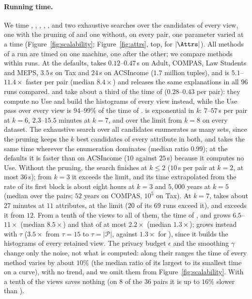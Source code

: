 \paragraph{Running time.}
We time \sys{}, \sysopt{}, \Bone{}, \Btwo{}, \BF{}, \SingleStage{} and two exhaustive searches over the candidates of every view, one with the pruning of \Btwo{} and one without, on every pair, one parameter varied at a time (Figure~\ref{fig:scalability}; Figure~\ref{fig:attrs}, top, for $|\Attrs|$).
All methods of a run are timed on one machine, one after the other; we compare methods within runs.
At the defaults, \sys{} takes $0.12$--$0.47$\,s on Adult, COMPAS, Law Students and MEPS, $3.5$\,s on Tax and $24$\,s on ACSIncome ($1.7$ million tuples), and \sysopt{} is $5.1$--$11.4\times$ faster per pair (median $8.4\times$) and releases the same explanations in all $96$ runs compared.
\BF{} and \SingleStage{} take about a third of the time of \sys{} ($0.28$--$0.43$ per pair): they compute no Use and build the histograms of every view instead, while the Use pass over every view is $94$--$99\%$ of the time of \sys{}.
\Btwo{} is exponential in $k$: $7$--$57$\,s per pair at $k=6$, $2.3$--$15.5$ minutes at $k=7$, and over the limit from $k=8$ on every dataset.
The exhaustive search over all candidates enumerates as many sets, since the pruning keeps the $k$ best candidates of every attribute in both, and takes the same time wherever the enumeration dominates (median ratio $0.99$); at the defaults it is faster than \Btwo{} on ACSIncome ($10$ against $25$\,s) because it computes no Use.
Without the pruning, the search finishes at $k \le 2$ ($10$\,s per pair at $k=2$, at most $36$\,s); from $k=3$ it exceeds the limit, and its time extrapolated from the rate of its first block is about eight hours at $k=3$ and $5{,}000$ years at $k=5$ (median over the pairs; $52$ years on COMPAS, $10^5$ on Tax).
At $k=7$, \Btwo{} takes about $27$ minutes at $11$ attributes, at the limit ($20$ of its $69$ runs exceed it), and exceeds it from $12$.
From a tenth of the views to all of them, the time of \sys{}, \BF{} and \SingleStage{} grows $6.5$--$11\times$ (median $8.5\times$) and that of \sysopt{} at most $2.2\times$ (median $1.3\times$); \sysopt{} grows instead with $\tau$ ($3.5\times$ from $\tau=15$ to $\tau=|\mathcal{P}|$, against $1.3\times$ for \sys{}), since it builds the histograms of every retained view.
The privacy budget $\epsilon$ and the smoothing $\gamma$ change only the noise, not what is computed: along their ranges the time of every method varies by about $10\%$ (the median ratio of its largest to its smallest time on a curve), with no trend, and we omit them from Figure~\ref{fig:scalability}.
With a tenth of the views \sysopt{} saves nothing (on $8$ of the $36$ pairs it is up to $16\%$ slower than \sys{}).

